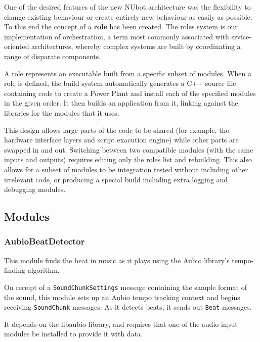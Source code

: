 \documentclass[english,12pt]{scrartcl}
\begin{document}
			One of the desired features of the new NUbot architecture was the flexibility to
			change existing behaviour or create entirely new behaviour as easily as possible. To
			this end the concept of a \textbf{role} has been created. The roles system is our
			implementation of orchestration, a term most commonly associated with srvice-oriented
			architectures, whereby complex systems are built by coordinating a range of disparate
			components.
			
			A role represents an executable built from a specific subset of modules. When a role
			is defined, the build system automatically generates a C++ source file containing code
			to create a Power Plant and install each of the specified modules in the given order.
			It then builds an application from it, linking against the libraries for the modules
			that it uses.
			
			This design allows large parts of the code to be shared (for example, the hardware
			interface layers and script exacution engine) while other parts are swapped in and
			out. Switching between two compatible modules (with the same inputs and outputs)
			requires editing only the roles list and rebuilding. This also allows for a subset of
			modules to be integration tested without including other irrelevant code, or
			producing a special build including extra logging and debugging modules.
			
		
		\subsection{Modules}
			
			\subsubsection{AubioBeatDetector}
				This module finds the beat in music as it plays using the Aubio library's
				tempo-finding algorithm.
				
				On receipt of a \texttt{SoundChunkSettings} message containing the sample format
				of the sound, this module sets up an Aubio tempo tracking context and begins
				receiving \texttt{SoundChunk} messages. As it detects beats, it sends out
				\texttt{Beat} messages.
				
				It depends on the libaubio library, and requires that one of the audio input
				modules be installed to provide it with data.
			
\end{document}
